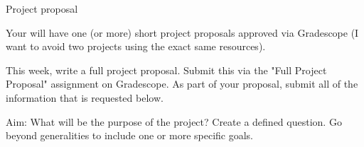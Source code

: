 \documentclass[12pt,letterpaper,noanswers]{exam}
\begin{document}
\begin{questions}





\item 

Project proposal

Your will have one (or more) short project proposals approved via Gradescope (I want to avoid two projects using the exact same resources).

This week, write a full project proposal.  Submit this via the "Full Project Proposal" assignment on Gradescope.  As part of your proposal, submit all of the information that is requested below.

\begin{parts}
    \item Aim: What will be the purpose of the project?  Create a defined question.  Go beyond generalities to include one or more specific goals.
    

\end{parts}
\end{questions}
\end{document}
